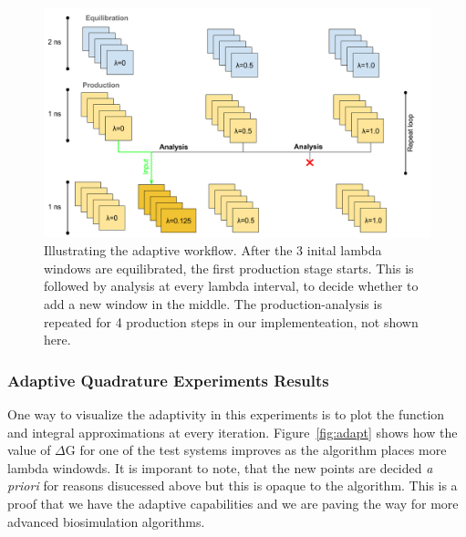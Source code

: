 \begin{figure}
  \centering
   \includegraphics[width=\columnwidth]{figures/Adaptive_TIES_1.png}
  \caption{Illustrating the adaptive workflow. After the 3 inital lambda windows are equilibrated, the first production stage starts. This is followed by analysis at every lambda interval, to decide whether to add a new window in the middle. The production-analysis is repeated for 4 production steps in our implementeation, not shown here.}
\label{fig:adaptive_TIES}
\end{figure}

\subsubsection{Adaptive Quadrature Experiments Results}

One way to visualize the adaptivity in this experiments is to plot the function
and integral approximations at every iteration. Figure~\ref{fig:adapt} shows
how the value of $\Delta$G for one of the test systems improves as the
algorithm places more lambda windowds. It is imporant to note, that the new
points are decided {\it a priori} for reasons disucessed above but this is
opaque to the algorithm. This is a proof that we have the adaptive capabilities
and we are paving the way for more advanced biosimulation algorithms.

